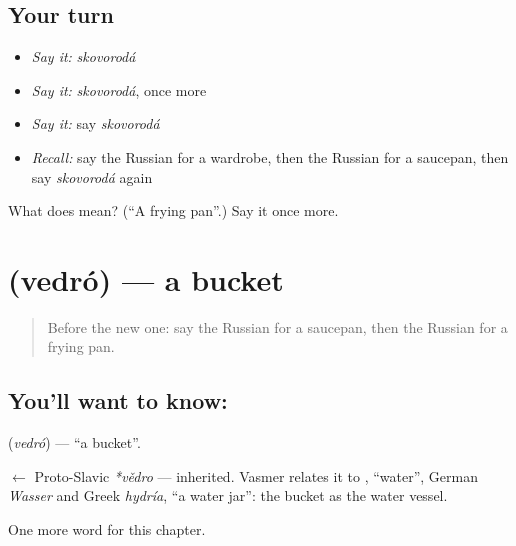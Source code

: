 \subsection*{Your turn}
\begin{itemize}
\raggedright
  \item \emph{Say it:} \emph{skovorodá}
  \item \emph{Say it:} \emph{skovorodá}, once more
  \item \emph{Say it:} say \emph{skovorodá}
  \item \emph{Recall:} say the Russian for a wardrobe, then the Russian for a saucepan, then say \emph{skovorodá} again
\end{itemize}

\begin{tcolorbox}[breakable,colback=teal!4,colframe=teal!35!black,title={Before you move on}]
What does  mean? (\textquotedblleft{}A frying pan\textquotedblright{}.) Say it once more.
\end{tcolorbox}
\section[\texorpdfstring{\ru{ведро} (vedró)}{ведро (vedró)}]{ (vedró) — a bucket}

\label{lesson:RU-C98-bucket}



\begin{quote}
Before the new one: say the Russian for a saucepan, then the Russian for a frying pan.
\end{quote}

\subsection*{You'll want to know: }
\textbf{} (\emph{vedró}) — \textquotedblleft{}a bucket\textquotedblright{}.

\begin{cousinweb}
\textbf{} $\leftarrow$ Proto-Slavic \emph{*vědro} — inherited. Vasmer relates it to \emph{}, \textquotedblleft{}water\textquotedblright{}, German \emph{Wasser} and Greek \emph{hydría}, \textquotedblleft{}a water jar\textquotedblright{}: the bucket as the water vessel.
\end{cousinweb}

\begin{grammarlens}[title={What you've built}]
One more word for this chapter.
\end{grammarlens}

